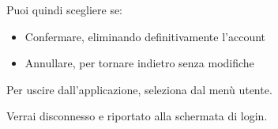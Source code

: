 Puoi quindi scegliere se:
\begin{itemize}[itemsep=5pt, parsep=5pt, label=$\scriptstyle\bullet$]
	\item Confermare, eliminando definitivamente l'account
	\item Annullare, per tornare indietro senza modifiche
\end{itemize}



Per uscire dall'applicazione, seleziona  dal menù utente.


Verrai disconnesso e riportato alla schermata di login.